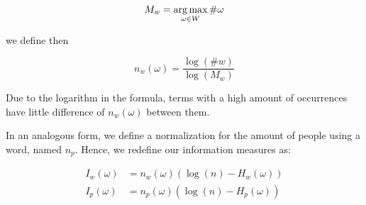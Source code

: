 \begin{equation}
    M_w = \operatorname*{arg\,max}\limits_{\omega \in W} \#\omega 
\end{equation}

we define then

\begin{equation}
    n_w(\omega) = \frac{\log(\# w)}{\log(M_w)}
\end{equation}

Due to the logarithm in the formula, terms with a high amount of occurrences have little difference of $n_w(\omega)$ between them.

In an analogous form, we define a normalization for the amount of people using a word, named $n_p$. Hence, we redefine our information measures as:

\begin{align}
  I_w(\omega) &= n_w(\omega) (\log(n) - H_w(\omega)) \\
  I_p(\omega) &= n_p(\omega) (\log(n) - H_p(\omega)) 
\end{align}


